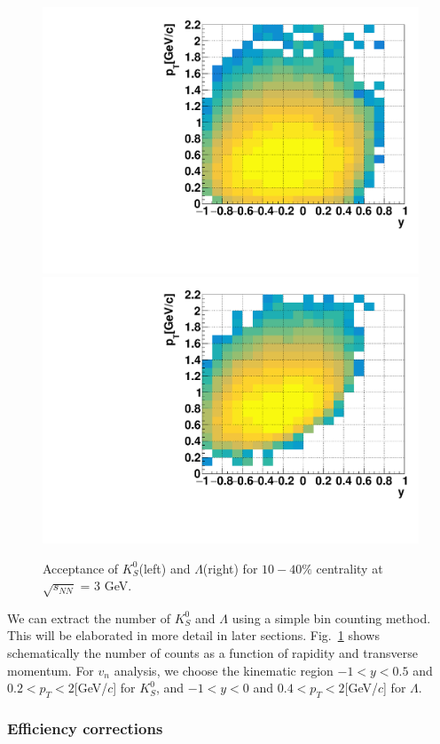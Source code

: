 \begin{figure}[h]
\includegraphics[width=0.49\linewidth]{chapterX/fig/ks_acc_v17.pdf}
\includegraphics[width=0.49\linewidth]{chapterX/fig/ld_acc_v17.pdf}
\caption{Acceptance of $K^0_S$(left) and $\Lambda$(right) for $10-40\%$ centrality at $\sqrt{s_{NN}}$ = 3 GeV.}
\label{ldks_acceptance}
\end{figure}

We can extract the number of $K^0_S$ and $\Lambda$ using a simple bin counting method. This will be elaborated in more detail in later sections. Fig.~\ref{ldks_acceptance} shows schematically the number of counts as a function of rapidity and transverse momentum. For $v_{n}$ analysis, we choose the kinematic region $-1<y<0.5$ and $0.2<p_{T}<2$[GeV/$c$] for $K^0_S$, and $-1<y<0$ and $0.4<p_{T}<2$[GeV/$c$] for $\Lambda$. 


\subsubsection{Efficiency corrections}


